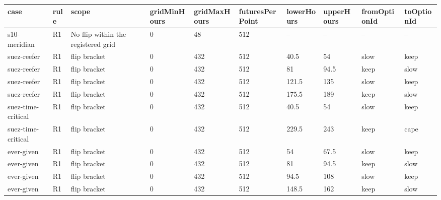 \begin{tabular}{llllllllll}
\toprule
case & rule & scope & gridMinHours & gridMaxHours & futuresPerPoint & lowerHours & upperHours & fromOptionId & toOptionId \\
\midrule
s10-meridian & R1 & No flip within the registered grid & 0 & 48 & 512 & -- & -- & -- & -- \\
suez-reefer & R1 & flip bracket & 0 & 432 & 512 & 40.5 & 54 & slow & keep \\
suez-reefer & R1 & flip bracket & 0 & 432 & 512 & 81 & 94.5 & keep & slow \\
suez-reefer & R1 & flip bracket & 0 & 432 & 512 & 121.5 & 135 & slow & keep \\
suez-reefer & R1 & flip bracket & 0 & 432 & 512 & 175.5 & 189 & keep & slow \\
suez-time-critical & R1 & flip bracket & 0 & 432 & 512 & 40.5 & 54 & slow & keep \\
suez-time-critical & R1 & flip bracket & 0 & 432 & 512 & 229.5 & 243 & keep & cape \\
ever-given & R1 & flip bracket & 0 & 432 & 512 & 54 & 67.5 & slow & keep \\
ever-given & R1 & flip bracket & 0 & 432 & 512 & 81 & 94.5 & keep & slow \\
ever-given & R1 & flip bracket & 0 & 432 & 512 & 94.5 & 108 & slow & keep \\
ever-given & R1 & flip bracket & 0 & 432 & 512 & 148.5 & 162 & keep & slow \\
\bottomrule
\end{tabular}
